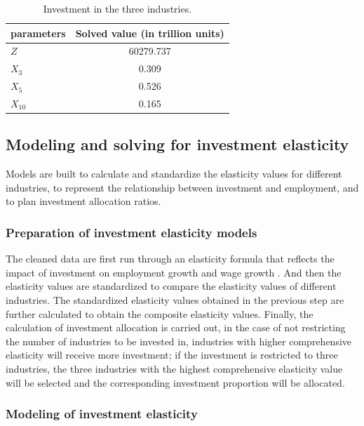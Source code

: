 \documentclass[12pt]{article}  %
\begin{document}
	
	\begin{table}[H]
		\centering
		\caption{Investment in the three industries.}
		\label{tab:solved_parameters}
		\begin{tabular}{lc}
			\toprule
			\textbf{parameters} & \textbf{Solved value (in trillion units)} \\
			\midrule
			$Z$ & 60279.737 \\
			$X_3$ & 0.309 \\
			$X_5$ & 0.526 \\
			$X_{10}$ & 0.165 \\
			\bottomrule
		\end{tabular}
	\end{table}

\subsection{Modeling and solving for investment elasticity}

	Models are built to calculate and standardize the elasticity values for different industries, to represent the relationship between investment and employment, and to plan investment allocation ratios.

\subsubsection{Preparation of investment elasticity models}

	The cleaned data are first run through an elasticity formula that reflects the impact of investment on employment growth and wage growth \cite{3}. And then the elasticity values are standardized to compare the elasticity values of different industries. The standardized elasticity values obtained in the previous step are further calculated to obtain the composite elasticity values. Finally, the calculation of investment allocation is carried out, in the case of not restricting the number of industries to be invested in, industries with higher comprehensive elasticity will receive more investment; if the investment is restricted to three industries, the three industries with the highest comprehensive elasticity value will be selected and the corresponding investment proportion will be allocated.

\subsubsection{Modeling of investment elasticity}
\end{document}
